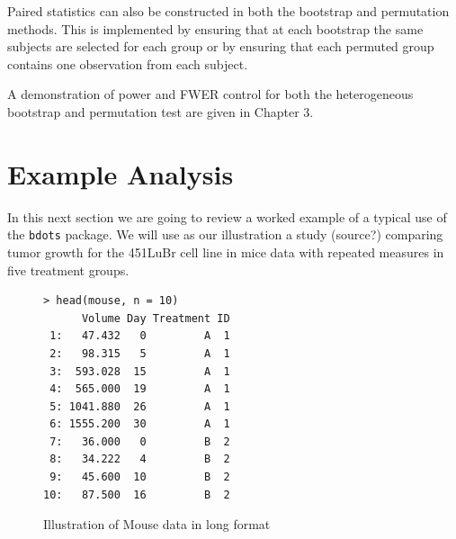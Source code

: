 \documentclass{article}
\newcommand{\xt}{\texttt}%
\begin{document}
Paired statistics can also be constructed in both the bootstrap and permutation methods. This is implemented by ensuring that at each bootstrap the same subjects are selected for each group or by ensuring that each permuted group contains one observation from each subject.

A demonstration of power and FWER control for both the heterogeneous bootstrap and permutation test are given in Chapter 3.

%


\section{Example Analysis}

In this next section we are going to review a worked example of a typical use of the \xt{bdots} package. We will use as our illustration a study (source?) comparing tumor growth for the 451LuBr cell line in mice data with repeated measures in five treatment groups.

\begin{singlespace}
\begin{figure}[H]
\centering
\begin{BVerbatim}
> head(mouse, n = 10)
      Volume Day Treatment ID
 1:   47.432   0         A  1
 2:   98.315   5         A  1
 3:  593.028  15         A  1
 4:  565.000  19         A  1
 5: 1041.880  26         A  1
 6: 1555.200  30         A  1
 7:   36.000   0         B  2
 8:   34.222   4         B  2
 9:   45.600  10         B  2
10:   87.500  16         B  2
\end{BVerbatim}
\caption{Illustration of Mouse data in long format}
\label{fig:mouse_head}
\end{figure}
\end{singlespace}
\end{document}
